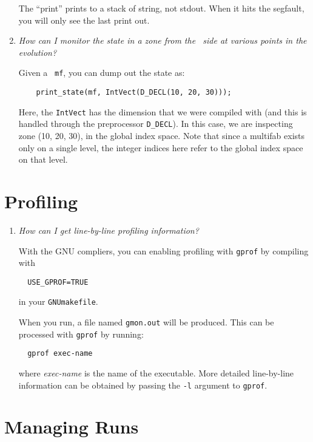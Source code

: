 \begin{enumerate}
    The ``print'' prints to a stack of string, not stdout.  When it
    hits the segfault, you will only see the last print out.



\item {\em How can I monitor the state in a zone from the \cpp\ side
  at various points in the evolution?}

  Given a \multifab\ {\tt mf}, you can dump out the state as:
\begin{verbatim}
    print_state(mf, IntVect(D_DECL(10, 20, 30)));
\end{verbatim}
  Here, the {\tt IntVect} has the dimension that we were compiled with
  (and this is handled through the preprocessor {\tt D\_DECL}).  In
  this case, we are inspecting zone (10, 20, 30), in the global index
  space.  Note that since a multifab exists only on a single level, the
  integer indices here refer to the global index space on that level.

\end{enumerate}


\section{Profiling}

\begin{enumerate}

\item {\em How can I get line-by-line profiling information?}

  With the GNU compliers, you can enabling profiling with {\tt gprof}
  by compiling with
\begin{verbatim}
  USE_GPROF=TRUE
\end{verbatim}
  in your {\tt GNUmakefile}.

  When you run, a file named {\tt gmon.out} will be produced.  This can
  be processed with {\tt gprof} by running:
\begin{verbatim}
  gprof exec-name
\end{verbatim}
  where {\em exec-name} is the name of the executable.  More detailed
  line-by-line information can be obtained by passing the {\tt -l}
  argument to {\tt gprof}.

\end{enumerate}


\section{Managing Runs}

